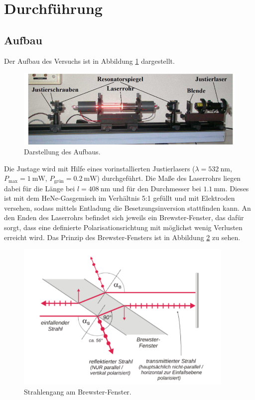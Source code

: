 \section{Durchführung}
\label{sec:Durchführung}

\subsection{Aufbau}

Der Aufbau des Versuchs ist in Abbildung \ref{fig:aufbau} dargestellt. 

\begin{figure}[H]
    \centering
    \includegraphics[scale=0.5]{content/aufbau.png}
    \caption{Darstellung des Aufbaus. \cite{alt}}
    \label{fig:aufbau}
\end{figure}

Die Justage wird mit Hilfe eines vorinstallierten Justierlasers ($\lambda = \SI{532}{\nano\metre}$, 
$P_\text{max} = \SI{1}{\milli\watt}$, $P_\text{grün} = \SI{0.2}{\milli\watt}$) durchgeführt. Die Maße des Laserrohrs liegen dabei 
für die Länge bei $l = \SI{408}{\nano\metre}$ und für den Durchmesser bei $\SI{1.1}{\milli\metre}$. Dieses ist mit dem HeNe-Gasgemisch 
im Verhältnis 5:1 gefüllt und mit Elektroden versehen, sodass mittels Entladung die Besetzungsinversion stattfinden kann. An den 
Enden des Laserrohrs befindet sich jeweils ein Brewster-Fenster, das dafür sorgt, dass eine definierte Polarisationsrichtung mit 
möglichst wenig Verlusten erreicht wird. Das Prinzip des Brewster-Fensters ist in Abbildung \ref{fig:brewster} zu sehen. 

\begin{figure}[H]
    \centering
    \includegraphics[scale=0.5]{content/brewster.png}
    \caption{Strahlengang am Brewster-Fenster. \cite{Zeugs}}
    \label{fig:brewster}
\end{figure}


